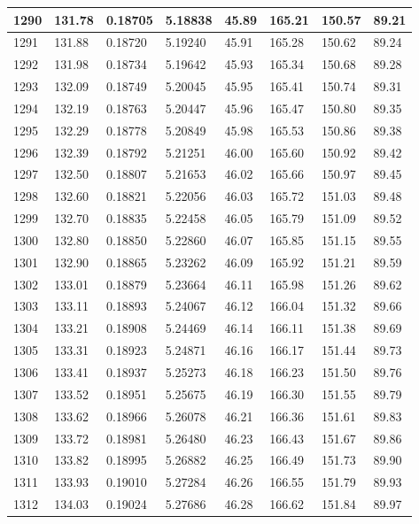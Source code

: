 \documentclass[12pt,a4paper,twoside]{article}
\begin{document}
\begin{center}
\begin{longtable}{l l l l | l l l l}
1290 & 131.78 & 0.18705 & 5.18838 & 45.89 & 165.21 & 150.57 & 89.21 \\ \hline
1291 & 131.88 & 0.18720 & 5.19240 & 45.91 & 165.28 & 150.62 & 89.24 \\ \hline
1292 & 131.98 & 0.18734 & 5.19642 & 45.93 & 165.34 & 150.68 & 89.28 \\ \hline
1293 & 132.09 & 0.18749 & 5.20045 & 45.95 & 165.41 & 150.74 & 89.31 \\ \hline
1294 & 132.19 & 0.18763 & 5.20447 & 45.96 & 165.47 & 150.80 & 89.35 \\ \hline
1295 & 132.29 & 0.18778 & 5.20849 & 45.98 & 165.53 & 150.86 & 89.38 \\ \hline
1296 & 132.39 & 0.18792 & 5.21251 & 46.00 & 165.60 & 150.92 & 89.42 \\ \hline
1297 & 132.50 & 0.18807 & 5.21653 & 46.02 & 165.66 & 150.97 & 89.45 \\ \hline
1298 & 132.60 & 0.18821 & 5.22056 & 46.03 & 165.72 & 151.03 & 89.48 \\ \hline
1299 & 132.70 & 0.18835 & 5.22458 & 46.05 & 165.79 & 151.09 & 89.52 \\ \hline
1300 & 132.80 & 0.18850 & 5.22860 & 46.07 & 165.85 & 151.15 & 89.55 \\ \hline
1301 & 132.90 & 0.18865 & 5.23262 & 46.09 & 165.92 & 151.21 & 89.59 \\ \hline
1302 & 133.01 & 0.18879 & 5.23664 & 46.11 & 165.98 & 151.26 & 89.62 \\ \hline
1303 & 133.11 & 0.18893 & 5.24067 & 46.12 & 166.04 & 151.32 & 89.66 \\ \hline
1304 & 133.21 & 0.18908 & 5.24469 & 46.14 & 166.11 & 151.38 & 89.69 \\ \hline
1305 & 133.31 & 0.18923 & 5.24871 & 46.16 & 166.17 & 151.44 & 89.73 \\ \hline
1306 & 133.41 & 0.18937 & 5.25273 & 46.18 & 166.23 & 151.50 & 89.76 \\ \hline
1307 & 133.52 & 0.18951 & 5.25675 & 46.19 & 166.30 & 151.55 & 89.79 \\ \hline
1308 & 133.62 & 0.18966 & 5.26078 & 46.21 & 166.36 & 151.61 & 89.83 \\ \hline
1309 & 133.72 & 0.18981 & 5.26480 & 46.23 & 166.43 & 151.67 & 89.86 \\ \hline
1310 & 133.82 & 0.18995 & 5.26882 & 46.25 & 166.49 & 151.73 & 89.90 \\ \hline
1311 & 133.93 & 0.19010 & 5.27284 & 46.26 & 166.55 & 151.79 & 89.93 \\ \hline
1312 & 134.03 & 0.19024 & 5.27686 & 46.28 & 166.62 & 151.84 & 89.97 \\ \hline

\end{longtable}
\end{center}
\end{document}
